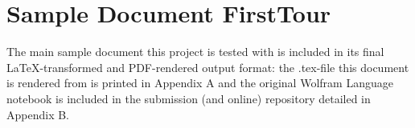 \chapter{Sample Document FirstTour}
\label{app:Sample}


The main sample document this project is tested with is included in its final LaTeX-transformed and PDF-rendered output format: the .tex-file this document is rendered from is printed in Appendix A and the original Wolfram Language notebook is included in the submission (and online) repository detailed in Appendix B.


